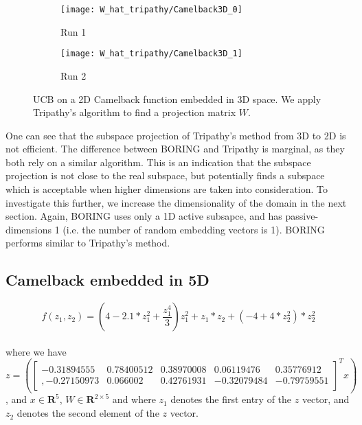 \begin{figure}[H]
    \centering
    \begin{subfigure}[b]{0.40\textwidth}
        \texttt{[image: W\_hat\_tripathy/Camelback3D\_0]}
        \label{fig:gull}
        \caption{Run 1}
    \end{subfigure}
    \begin{subfigure}[b]{0.40\textwidth}
        \texttt{[image: W\_hat\_tripathy/Camelback3D\_1]}
        \label{fig:tiger}
        \caption{Run 2}
    \end{subfigure}   
        \caption{UCB on a 2D Camelback function embedded in 3D space.
          We apply Tripathy's algorithm to find a projection matrix $W$.}
\end{figure}

One can see that the subspace projection of Tripathy's method from 3D to 2D is not efficient. 
The difference between BORING and Tripathy is marginal, as they both rely on a similar algorithm.
This is an indication that the subspace projection is not close to the real subspace, but potentially finds a subspace which is acceptable when higher dimensions are taken into consideration.
To investigate this further, we increase the dimensionality of the domain in the next section.
Again, BORING uses only a 1D active subsapce, and has passive-dimensions 1 (i.e. the number of random embedding vectors is 1).
BORING performs similar to Tripathy's method.

\subsection{Camelback embedded in 5D}

\def\WCamelback5D{
\begin{bmatrix}
     -0.31894555 & 0.78400512 & 0.38970008 & 0.06119476 & 0.35776912 \\,
     -0.27150973 & 0.066002 & 0.42761931 & -0.32079484 &-0.79759551
\end{bmatrix}}

\begin{equation}
f(z_1, z_2) = \left( 4 - 2.1 * z_1^2 + \frac{z_1^4}{3} \right)  z_1^2 + z_1 *  z_2 + \left(-4 + 4 * z_2^2 \right) * z_2^2
\end{equation} \\

where we have \\
$z = \left( \WCamelback5D^T x \right) $, and $ x \in \mathbf{R}^5$, $W \in \mathbf{R}^{2 \times 5}$
and where $z_1$ denotes the first entry of the $z$ vector, and $z_2$ denotes the second element of the $z$ vector.

